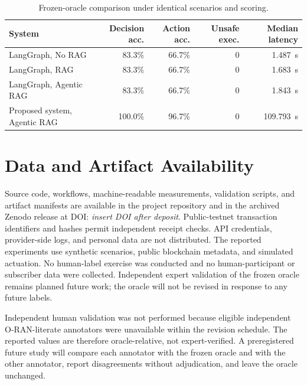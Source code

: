 \begin{table}[t]
\centering
\caption{Frozen-oracle comparison under identical scenarios and scoring.}
\label{tab:external-baseline}
\begin{tabular}{lrrrr}
\hline
System & Decision acc. & Action acc. & Unsafe exec. & Median latency \\
\hline
LangGraph, No RAG & 83.3\% & 66.7\% & 0 & 1.487~s \\
LangGraph, RAG & 83.3\% & 66.7\% & 0 & 1.683~s \\
LangGraph, Agentic RAG & 83.3\% & 66.7\% & 0 & 1.843~s \\
Proposed system, Agentic RAG & 100.0\% & 96.7\% & 0 & 109.793~s \\
\hline
\end{tabular}
\end{table}

\section*{Data and Artifact Availability}
Source code, workflows, machine-readable measurements, validation scripts, and
artifact manifests are available in the project repository and in the archived
Zenodo release at DOI: \textit{insert DOI after deposit}. Public-testnet
transaction identifiers and hashes permit independent receipt checks. API
credentials, provider-side logs, and personal data are not distributed. The
reported experiments use synthetic scenarios, public blockchain metadata, and
simulated actuation. No human-label exercise was conducted and no
human-participant or subscriber data were collected. Independent expert
validation of the frozen oracle remains planned future work; the oracle will not
be revised in response to any future labels.

Independent human validation was not performed because eligible independent
O-RAN-literate annotators were unavailable within the revision schedule. The
reported values are therefore oracle-relative, not expert-verified. A
preregistered future study will compare each annotator with the frozen oracle
and with the other annotator, report disagreements without adjudication, and
leave the oracle unchanged.
